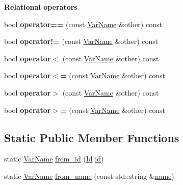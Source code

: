 \begin{Indent}{\bf Relational operators}\par
\begin{DoxyCompactItemize}
\item 
bool {\bfseries operator==} (const \hyperlink{classcreek_1_1_var_name}{Var\+Name} \&other) const \hypertarget{classcreek_1_1_var_name_a64bce8ab034edab66f6c384a5fe6a040}{}\label{classcreek_1_1_var_name_a64bce8ab034edab66f6c384a5fe6a040}

\item 
bool {\bfseries operator!=} (const \hyperlink{classcreek_1_1_var_name}{Var\+Name} \&other) const \hypertarget{classcreek_1_1_var_name_a6000be2aeb0a6127c6c63cca3725e6b3}{}\label{classcreek_1_1_var_name_a6000be2aeb0a6127c6c63cca3725e6b3}

\item 
bool {\bfseries operator$<$} (const \hyperlink{classcreek_1_1_var_name}{Var\+Name} \&other) const \hypertarget{classcreek_1_1_var_name_a1542c907410fab42087e2f6721b9a515}{}\label{classcreek_1_1_var_name_a1542c907410fab42087e2f6721b9a515}

\item 
bool {\bfseries operator$<$=} (const \hyperlink{classcreek_1_1_var_name}{Var\+Name} \&other) const \hypertarget{classcreek_1_1_var_name_a5dc206221f9d51cef9af5575e88d7298}{}\label{classcreek_1_1_var_name_a5dc206221f9d51cef9af5575e88d7298}

\item 
bool {\bfseries operator$>$} (const \hyperlink{classcreek_1_1_var_name}{Var\+Name} \&other) const \hypertarget{classcreek_1_1_var_name_a3fa6a6c2f70fa3c82982606550c02f0a}{}\label{classcreek_1_1_var_name_a3fa6a6c2f70fa3c82982606550c02f0a}

\item 
bool {\bfseries operator$>$=} (const \hyperlink{classcreek_1_1_var_name}{Var\+Name} \&other) const \hypertarget{classcreek_1_1_var_name_adb69054f39bd733a84a3906d2bef9e85}{}\label{classcreek_1_1_var_name_adb69054f39bd733a84a3906d2bef9e85}

\end{DoxyCompactItemize}
\end{Indent}
\subsection*{Static Public Member Functions}
\begin{DoxyCompactItemize}
\item 
static \hyperlink{classcreek_1_1_var_name}{Var\+Name} \hyperlink{classcreek_1_1_var_name_af213ad4cfc09a5d933ab63153ad18d7d}{from\+\_\+id} (\hyperlink{classcreek_1_1_var_name_a8dcbc9cf867fbb7e2f8202132de8690d}{Id} \hyperlink{classcreek_1_1_var_name_a0cbd3de45ec3a671ef91b99cac2ed803}{id})
\item 
static \hyperlink{classcreek_1_1_var_name}{Var\+Name} \hyperlink{classcreek_1_1_var_name_a3ec6f9ecb2a566328f992b3c67731049}{from\+\_\+name} (const std\+::string \&\hyperlink{classcreek_1_1_var_name_af508e16490f2cfbfdcb561f9c855fcf0}{name})
\end{DoxyCompactItemize}


